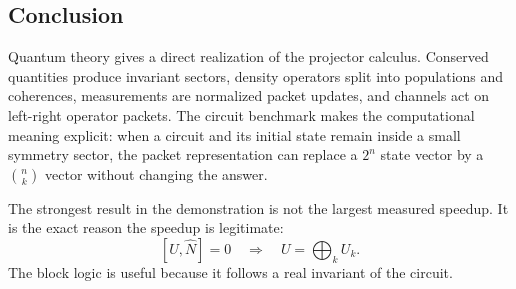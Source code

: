 \documentclass[10pt]{article}
\begin{document}
\subsection{Conclusion}

Quantum theory gives a direct realization of the projector calculus.  Conserved quantities produce invariant sectors, density operators split into populations and coherences, measurements are normalized packet updates, and channels act on left-right operator packets.  The circuit benchmark makes the computational meaning explicit: when a circuit and its initial state remain inside a small symmetry sector, the packet representation can replace a $2^n$ state vector by a $\binom nk$ vector without changing the answer.

The strongest result in the demonstration is not the largest measured speedup.  It is the exact reason the speedup is legitimate:
\[
        [U,\widehat N]=0
        \quad\Longrightarrow\quad
        U=\bigoplus_kU_k.
\]
The block logic is useful because it follows a real invariant of the circuit.
\end{document}
